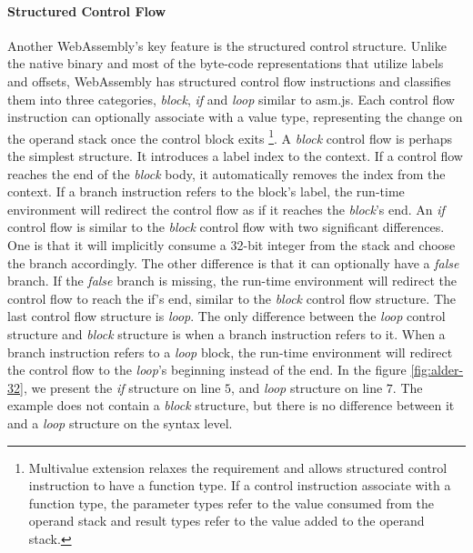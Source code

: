 \paragraph{Structured Control Flow}
Another WebAssembly's key feature is the structured control structure. Unlike the native binary and most of the byte-code representations that utilize labels and offsets, WebAssembly has structured control flow instructions and classifies them into three categories, \emph{block}, \emph{if} and \emph{loop} similar to asm.js. Each control flow instruction can optionally associate with a value type, representing the change on the operand stack once the control block exits \footnote{Multivalue extension relaxes the requirement and allows structured control instruction to have a function type. If a control instruction associate with a function type, the parameter types refer to the value consumed from the operand stack and result types refer to the value added to the operand stack.}. A \emph{block} control flow is perhaps the simplest structure. It introduces a label index to the context. If a control flow reaches the end of the \emph{block} body, it automatically removes the index from the context. If a branch instruction refers to the block's label, the run-time environment will redirect the control flow as if it reaches the \emph{block}'s end. An \emph{if} control flow is similar to the \emph{block} control flow with two significant differences. One is that it will implicitly consume a 32-bit integer from the stack and choose the branch accordingly. The other difference is that it can optionally have a \emph{false} branch. If the \emph{false} branch is missing, the run-time environment will redirect the control flow to reach the {if}'s end, similar to the \emph{block} control flow structure. The last control flow structure is \emph{loop}. The only difference between the \emph{loop} control structure and \emph{block} structure is when a branch instruction refers to it. When a branch instruction refers to a \emph{loop} block, the run-time environment will redirect the control flow to the \emph{loop}'s beginning instead of the end. In the figure \ref{fig:alder-32}, we present the \emph{if} structure on line $5$, and \emph{loop} structure on line $7$. The example does not contain a \emph{block} structure, but there is no difference between it and a \emph{loop} structure on the syntax level.

